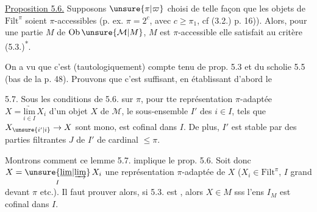 
\uline{Proposition 5.6.} Supposons $\unsure{\pi|\varpi}$ choisi de telle façon
que les objets de $\mathrm{Filt}^{\pi}$ soient $\pi$-accessibles
(p. ex. $\pi=2^c$, avec $c\geq\pi_1$\deleted{\unsure{\}}}, cf (3.2.) p. 16)).
Alors, pour une partie $M$ de $\mathrm{Ob}\,\unsure{\mathcal M|M}$, $M$ est
$\pi$-accessible  elle satisfait au critère (5.3.)\textsuperscript{*}.

On a vu que c'est  (tautologiquement)\deleted{\unsure{,}}
compte tenu de prop. 5.3 et du scholie 5.5
(bas de la p. 48). Prouvons que c'est
suffisant, en établissant d'abord le

\uline{} 5.7. Sous les conditions de
5.6. sur $\pi$, 
pour tte représentation $\pi$-adaptée
$X=\underset{i\in I}{\underrightarrow{\mathrm{lim}}}\,X_i$ d'un objet $X$ de $\mathcal M$,
 le sous-ensemble $I'$  des
$i\in I$, tels que  $X_{\unsure{i'|i}}\to X$
sont mono, est cofinal dans $I$. De plus, $I'$ est stable par   des  parties filtrantes $J$ de $I'$ de cardinal $\leq\pi$.

Montrons comment ce lemme 5.7.
implique le  prop. 5.6.  Soit donc
$X=\underset{I}{\unsure{\underline{\mathrm{lim}}|\underrightarrow{\mathrm{lim}}}}\,X_i$ une représentation $\pi$-adaptée
de $X$ ($X_i\in\mathrm{Filt}^{\pi}$, $I$ grand devant $\pi$
etc.). Il faut prouver alors,  si
5.3. est , alors $X\in M$ sss l'ens
$I_M$ est cofinal dans $I$.

